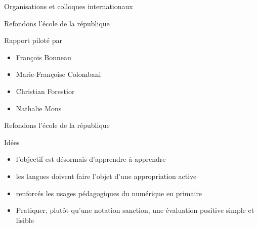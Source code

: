 \begin{frame}{Organisations et colloques internationaux}
\end{frame}

\begin{frame}{Refondons l'école de la république}

\begin{block}{Rapport piloté par}
  \begin{itemize}
  \item François Bonneau
  \item Marie-Françoise Colombani
  \item Christian Forestior
  \item Nathalie Mons
  \end{itemize}
\end{block}

\end{frame}


\begin{frame}{Refondons l'école de la république}

\begin{block}{Idées}
  \begin{itemize}
    \item l’objectif est désormais d’apprendre à apprendre
    \item les langues doivent faire l’objet d’une appropriation active
    \item renforcés les usages pédagogiques du numérique en primaire
   \item Pratiquer, plutôt qu’une notation sanction, une évaluation positive simple et lisible
  \end{itemize}
\end{block}
\end{frame}

